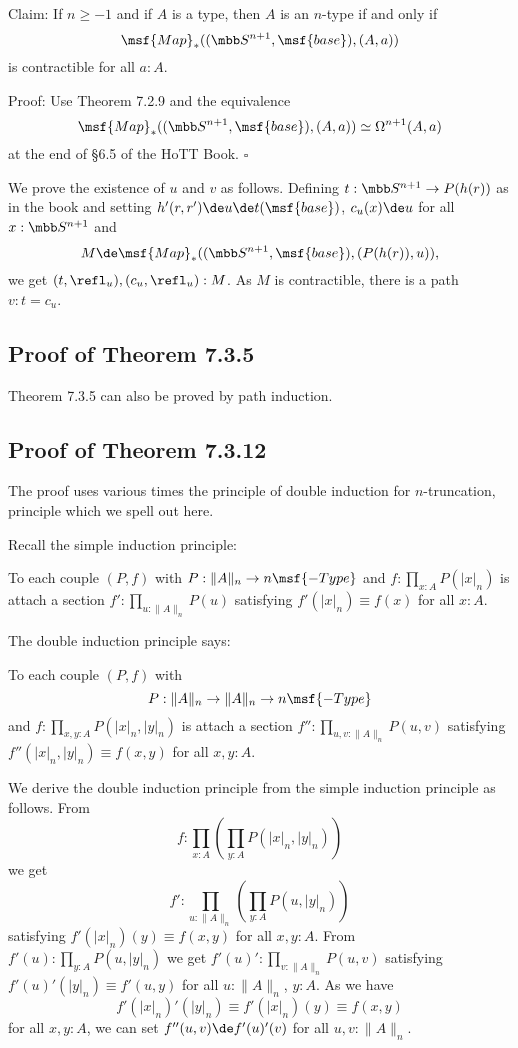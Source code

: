 \documentclass[12pt]{article}
\begin{document}
Claim: If $n\ge-1$ and if $A$ is a type, then $A$ is an $n$-type if and only if $$\msf{Map}_*((\mbb S^{n+1},\msf{base}),(A,a))$$ is contractible for all $a:A$.

\nn Proof: Use Theorem 7.2.9 and the equivalence 
$$
\msf{Map}_*((\mbb S^{n+1},\msf{base}),(A,a))\simeq\Omega^{n+1}(A,a)
$$ 
at the end of \S6.5 of the HoTT Book. $\square$

We prove the existence of $u$ and $v$ as follows. Defining $t:\mbb S^{n+1}\to P(h(r))$ as in the book and setting $h'(r,r')\de u\de t(\msf{base})$, $c_u(x)\de u$ for all $x:\mbb S^{n+1}$ and 
$$
M\de\msf{Map}_*((\mbb S^{n+1},\msf{base}),(P(h(r)),u)),
$$ 
we get $(t,\refl_u),(c_u,\refl_u):M$. As $M$ is contractible, there is a path $v:t=c_u$.


\subsection{Proof of Theorem 7.3.5}

Theorem 7.3.5 can also be proved by path induction.


\subsection{Proof of Theorem 7.3.12}

The proof uses various times the principle of double induction for $n$-truncation, principle which we spell out here.

Recall the simple induction principle:

To each couple $(P,f)$ with $P:\lVert A\rVert_n\to n\msf{-Type}$ and $f:\prod_{x:A}P(\lvert x\rvert_n)$ is attach a section $f':\prod_{u:\lVert A\rVert_n}P(u)$ satisfying $f'(\lvert x\rvert_n)\equiv f(x)$ for all $x:A$.

The double induction principle says:

To each couple $(P,f)$ with $$P:\lVert A\rVert_n\to\lVert A\rVert_n\to n\msf{-Type}$$ and $f:\prod_{x,y:A}P(\lvert x\rvert_n,\lvert y\rvert_n)$ is attach a section $f'':\prod_{u,v:\lVert A\rVert_n}P(u,v)$ satisfying $f''(\lvert x\rvert_n,\lvert y\rvert_n)\equiv f(x,y)$ for all $x,y:A$.

We derive the double induction principle from the simple induction principle as follows. From 
$$
f:\prod_{x:A}\left(\prod_{y:A}P(\lvert x\rvert_n,\lvert y\rvert_n)\right)
$$ 
we get 
$$
f':\prod_{u:\lVert A\rVert_n}\left(\prod_{y:A}P(u,\lvert y\rvert_n)\right)
$$ 
satisfying $f'(\lvert x\rvert_n)(y)\equiv f(x,y)$ for all $x,y:A$. From $f'(u):\prod_{y:A}P(u,\lvert y\rvert_n)$ we get $f'(u)':\prod_{v:\lVert A\rVert_n}P(u,v)$ satisfying $f'(u)'(\lvert y\rvert_n)\equiv f'(u,y)$ for all $u:\lVert A\rVert_n$, $y:A$. As we have 
$$
f'(\lvert x\rvert_n)'(\lvert y\rvert_n)\equiv f'(\lvert x\rvert_n)(y)\equiv f(x,y) 
$$ 
for all $x,y:A$, we can set $f''(u,v)\de f'(u)'(v)$ for all $u,v:\lVert A\rVert_n$. 
\end{document}
